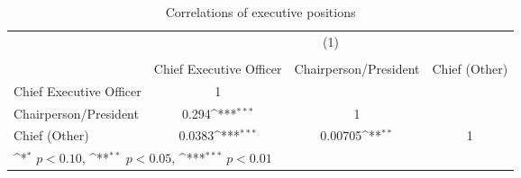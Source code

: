 \begin{table}[htbp]\centering
\def\sym#1{\ifmmode^{#1}\else\(^{#1}\)\fi}
\caption{Correlations of executive positions}
\begin{tabular}{l*{3}{c}}
\toprule
                &\multicolumn{3}{c}{(1)}                                 \\
                &\multicolumn{3}{c}{}                                    \\
                &Chief Executive Officer         &Chairperson/President         &Chief (Other)         \\
\midrule
Chief Executive Officer&        1         &                  &                  \\
Chairperson/President&    0.294\sym{***}&        1         &                  \\
Chief (Other)   &   0.0383\sym{***}&  0.00705\sym{**} &        1         \\
\bottomrule
\multicolumn{4}{l}{\footnotesize \sym{*} \(p<0.10\), \sym{**} \(p<0.05\), \sym{***} \(p<0.01\)}\\
\end{tabular}
\end{table}
